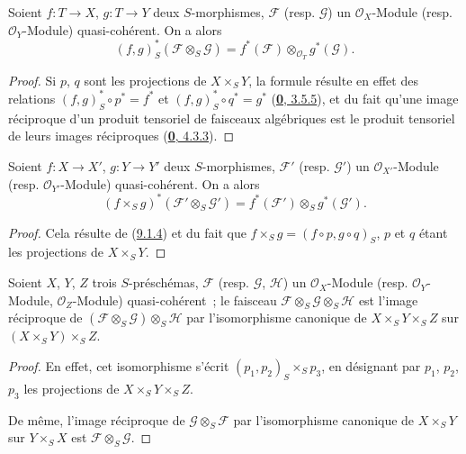 \begin{proposition}[9.1.4]
\label{I.9.1.4-fr}
Soient $f:T\to X$, $g:T\to Y$ deux $S$-morphismes, $\mathscr{F}$ \textup{(resp.
$\mathscr{G}$)} un $\mathscr{O}_X$-Module \textup{(resp.} $\mathscr{O}_Y$-Module)
quasi-cohérent. On a alors
\[
  (f,g)_S^*(\mathscr{F}\otimes_S\mathscr{G})
  =f^*(\mathscr{F})\otimes_{\mathscr{O}_T}g^*(\mathscr{G}).
\]
\end{proposition}

\begin{proof}
Si $p$, $q$ sont les projections de $X\times_S Y$, la formule résulte en
effet des relations $(f,g)_S^*\circ p^*=f^*$ et
$(f,g)_S^*\circ q^*=g^*$ (\hyperref[0.3.5.5-fr]{\textbf{0}, 3.5.5}), et du fait
qu'une image réciproque d'un produit tensoriel de faisceaux algébriques est
le produit tensoriel de leurs images réciproques
(\hyperref[0.4.3.3-fr]{\textbf{0}, 4.3.3}).
\end{proof}

\begin{corollary}[9.1.5]
\label{I.9.1.5-fr}
Soient $f:X\to X'$, $g:Y\to Y'$ deux $S$-morphismes, $\mathscr{F}'$ \textup{(resp.
$\mathscr{G}'$)} un $\mathscr{O}_{X'}$-Module \textup{(resp.}
$\mathscr{O}_{Y'}$-Module) quasi-cohérent. On a alors
\[
  (f\times_S g)^*(\mathscr{F}'\otimes_S\mathscr{G}')
  =f^*(\mathscr{F}')\otimes_S g^*(\mathscr{G}').
\]
\end{corollary}

\begin{proof}
Cela résulte de (\hyperref[I.9.1.4-fr]{9.1.4}) et du fait que
$f\times_S g=(f\circ p,g\circ q)_S$, $p$ et $q$ étant les projections de
$X\times_S Y$.
\end{proof}

\begin{corollary}[9.1.6]
\label{I.9.1.6-fr}
Soient $X$, $Y$, $Z$ trois $S$-préschémas, $\mathscr{F}$ \textup{(resp.
$\mathscr{G}$, $\mathscr{H}$)} un $\mathscr{O}_X$-Module \textup{(resp.}
$\mathscr{O}_Y$-Module, $\mathscr{O}_Z$-Module) quasi-cohérent~; le faisceau
$\mathscr{F}\otimes_S\mathscr{G}\otimes_S\mathscr{H}$ est l'image
réciproque de
$(\mathscr{F}\otimes_S\mathscr{G})\otimes_S\mathscr{H}$ par l'isomorphisme
canonique de $X\times_S Y\times_S Z$ sur
$(X\times_S Y)\times_S Z$.
\end{corollary}

\begin{proof}
En effet, cet isomorphisme s'écrit $(p_1,p_2)_S\times_S p_3$, en désignant
par $p_1$, $p_2$, $p_3$ les projections de $X\times_S Y\times_S Z$.

De même, l'image réciproque de $\mathscr{G}\otimes_S\mathscr{F}$ par
l'isomorphisme canonique de $X\times_S Y$ sur $Y\times_S X$ est
$\mathscr{F}\otimes_S\mathscr{G}$.
\end{proof}

